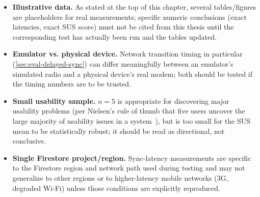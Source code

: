 \begin{itemize}
  \item \textbf{Illustrative data.} As stated at the top of this chapter,
  several tables/figures are placeholders for real measurements; specific
  numeric conclusions (exact latencies, exact SUS score) must not be cited
  from this thesis until the corresponding test has actually been run and
  the tables updated.
  \item \textbf{Emulator vs. physical device.} Network transition timing
  in particular (\cref{sec:eval-delayed-sync}) can differ meaningfully
  between an emulator's simulated radio and a physical device's real
  modem; both should be tested if the timing numbers are to be trusted.
  \item \textbf{Small usability sample.} $n=5$ is appropriate for
  discovering major usability problems (per Nielsen's rule of thumb that
  five users uncover the large majority of usability issues in a
  system~\cite{nielsen2000}), but is too small for the SUS mean to be
  statistically robust; it should be read as directional, not conclusive.
  \item \textbf{Single Firestore project/region.} Sync-latency
  measurements are specific to the Firestore region and network path used
  during testing and may not generalize to other regions or to
  higher-latency mobile networks (3G, degraded Wi-Fi) unless those
  conditions are explicitly reproduced.
\end{itemize}
